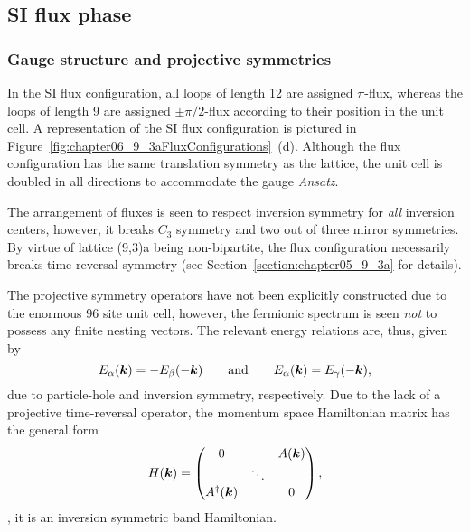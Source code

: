 %
%
\subsection{SI flux phase}
\label{section:chapter06_SIPhase}
%
%
\subsubsection{Gauge structure and projective symmetries}
%
%
In the SI flux configuration, all loops of length 12 are assigned $\pi$-flux, whereas the loops of length 9 are assigned $\pm \pi/2$-flux according to their position in the unit cell.
A representation of the SI flux configuration is pictured in Figure~\ref{fig:chapter06_9_3aFluxConfigurations}~(d).
Although the flux configuration has the same translation symmetry as the lattice, the unit cell is doubled in all directions to accommodate the gauge \textit{Ansatz}.

The arrangement of fluxes is seen to respect inversion symmetry for \textit{all} inversion centers, however, it breaks $C_3$ symmetry and two out of three mirror symmetries.
By virtue of lattice (9,3)a being non-bipartite, the flux configuration necessarily breaks time-reversal symmetry (see Section~\ref{section:chapter05_9_3a} for details).

The projective symmetry operators have not been explicitly constructed due to the enormous 96 site unit cell, however, the fermionic spectrum is seen \textit{not} to possess any finite nesting vectors.
The relevant energy relations are, thus, given by
%
\begin{equation}
	E_{\alpha}(\bm{k}) = -E_{\beta}(-\bm{k}) \qquad {\rm and} \qquad E_{\alpha}(\bm{k}) = E_{\gamma}(-\bm{k}),
\end{equation}
%
due to particle-hole and inversion symmetry, respectively.
Due to the lack of a projective time-reversal operator, the momentum space Hamiltonian matrix has the general form
%
\begin{equation}
	H(\bm{k}) = 
		\begin{pmatrix}
			0			&		 & A(\bm{k}) \\
						& \ddots & 		  \\
			A^{\dagger}(\bm{k})	&		 & 0
		\end{pmatrix},
\end{equation}
%
\ie, it is an inversion symmetric band Hamiltonian.


